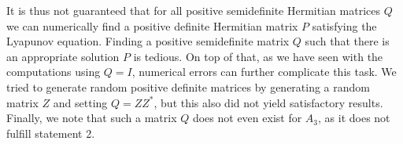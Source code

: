 \documentclass[11pt]{article}
\begin{document}
It is thus not guaranteed that for all positive semidefinite Hermitian matrices $Q$ we can numerically find a positive definite Hermitian matrix $P$ satisfying the Lyapunov equation. Finding a positive semidefinite matrix $Q$ such that there is an appropriate solution $P$ is tedious. On top of that, as we have seen with the computations using $Q=I$, numerical errors can further complicate this task. We tried to generate random positive definite matrices by generating a random matrix $Z$ and setting $Q=ZZ^*$, but this also did not yield satisfactory results. Finally, we note that such a matrix $Q$ does not even exist for $A_3$, as it does not fulfill statement 2.
\end{document}
